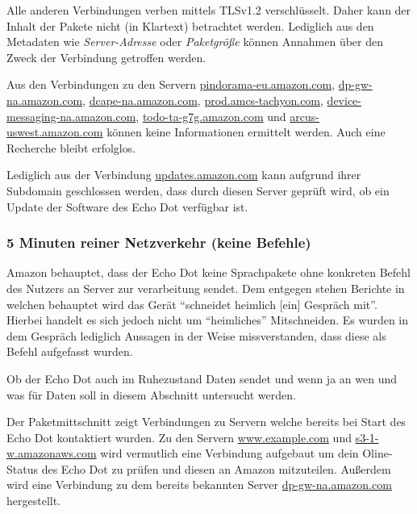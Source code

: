 Alle anderen Verbindungen verben mittels TLSv1.2 verschlüsselt.
Daher kann der Inhalt der Pakete nicht (in Klartext) betrachtet werden.
Lediglich aus den Metadaten wie \textit{Server-Adresse} oder \textit{Paketgröße} können Annahmen über den Zweck der Verbindung getroffen werden.


Aus den Verbindungen zu den Servern
\url{pindorama-eu.amazon.com},
\url{dp-gw-na.amazon.com},
\url{dcape-na.amazon.com},
\url{prod.amcs-tachyon.com},
\url{device-messaging-na.amazon.com},
\url{todo-ta-g7g.amazon.com} und
\url{arcus-uswest.amazon.com}
können keine Informationen ermittelt werden.
Auch eine Recherche bleibt erfolglos.

Lediglich aus der Verbindung \url{updates.amazon.com} kann aufgrund ihrer Subdomain geschlossen werden,
dass durch diesen Server geprüft wird, ob ein Update der Software des Echo Dot verfügbar ist.


\subsubsection{5 Minuten reiner Netzverkehr (keine Befehle)}
Amazon behauptet, dass der Echo Dot keine Sprachpakete ohne konkreten Befehl des Nutzers an Server zur verarbeitung sendet.
Dem entgegen stehen Berichte in welchen behauptet wird das Gerät \enquote{schneidet heimlich [ein] Gespräch mit}\cite{AmazonEc81:online}.
Hierbei handelt es sich jedoch nicht um \enquote{heimliches} Mitschneiden. Es wurden in dem Gespräch lediglich Aussagen in der Weise missverstanden,
dass diese als Befehl aufgefasst wurden.

Ob der Echo Dot auch im Ruhezustand Daten sendet und wenn ja an wen und was für Daten soll in diesem Abschnitt untersucht werden.

Der Paketmittschnitt zeigt Verbindungen zu Servern welche bereits bei Start des Echo Dot kontaktiert wurden.
Zu den Servern \url{www.example.com} und \url{s3-1-w.amazonaws.com} wird vermutlich eine Verbindung aufgebaut um dein Oline-Status des Echo Dot zu prüfen und diesen an Amazon mitzuteilen.
Außerdem wird eine Verbindung zu dem bereits bekannten Server \url{dp-gw-na.amazon.com} hergestellt.

